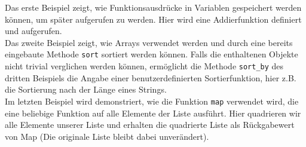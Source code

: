 \begin{ruby}[label=IRB]
         

\PY{o}{[}\PY{o}{]}

\PY{o}{[}      \PY{o}{]}   

   
\end{ruby}
Das erste Beispiel zeigt, wie Funktionsausdrücke in Variablen gespeichert werden können, um später aufgerufen zu werden. Hier wird eine Addierfunktion definiert und aufgerufen.\\
Das zweite Beispiel zeigt, wie Arrays verwendet werden und durch eine bereits eingebaute Methode \texttt{sort} sortiert werden können. Falls die enthaltenen Objekte nicht trivial verglichen werden können, ermöglicht die Methode \texttt{sort\_by} des dritten Beispiels die Angabe einer benutzerdefinierten Sortierfunktion, hier z.B. die Sortierung nach der Länge eines Strings.\\
Im letzten Beispiel wird demonstriert, wie die Funktion \texttt{map} verwendet wird, die eine beliebige Funktion auf alle Elemente der Liste ausführt. Hier quadrieren wir alle Elemente unserer Liste und erhalten die quadrierte Liste als Rückgabewert von Map (Die originale Liste bleibt dabei unverändert).



